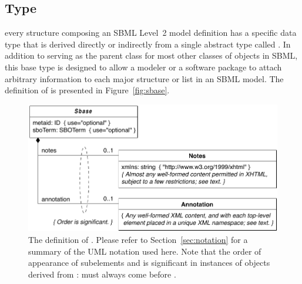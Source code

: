 \makeatletter
\renewcommand{\thesection}      {\changed{\@arabic\c@section}}
\renewcommand{\thesubsection}   {\changed{\thesection.\@arabic\c@subsection}}
\renewcommand{\thesubsubsection}{\changed{\thesubsection .\@arabic\c@subsubsection}}
\renewcommand{\theparagraph}    {\changed{\thesubsubsection.\@arabic\c@paragraph}}
\makeatother


\subsection{Type }
\label{sec:sbase}

 every structure composing an SBML Level~2 model definition has a
specific data type that is derived directly or indirectly from a
single abstract type called \SBase.  In addition to
serving as the parent class for most other classes of objects in
SBML, this base type is designed to allow a modeler
or a software package to attach arbitrary information to each major
structure or list in an SBML model.  The definition of \SBase is
presented in Figure~\vref{fig:sbase}.

\begin{figure}[hbt]
  \centering
  \small
  \includegraphics[scale=0.8]{figs/sbase-uml}
  \caption{The definition of \SBase.  Please refer to
    Section~\protect\ref{sec:notation} for a summary of the UML
    notation used here.  Note that the order of appearance of
    subelements  and  is
    significant in instances of objects derived from
    :  must always come before
    .}
  \label{fig:sbase}
\end{figure}


